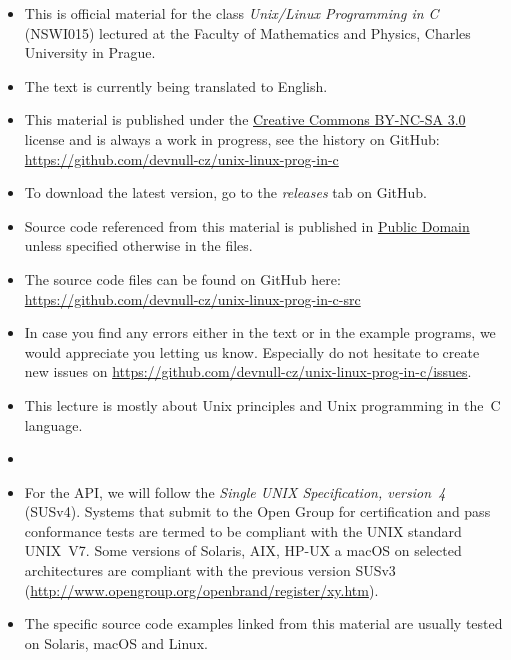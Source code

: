 \begin{itemize}
\item This is official material for the class \emph{Unix/Linux Programming in C}
(NSWI015) lectured at the Faculty of Mathematics and Physics, Charles University
in Prague.
\item The text is currently being translated to English.
\item This material is published under the
\href{http://creativecommons.org/licenses/by-nc-sa/3.0/cz/}{Creative Commons
BY-NC-SA 3.0} license and is always a work in progress, see the history on
GitHub:\\
\url{https://github.com/devnull-cz/unix-linux-prog-in-c}
\item To download the latest version, go to the \emph{releases} tab on GitHub.
\item Source code referenced from this material is published in
\href{http://creativecommons.org/licenses/publicdomain/}{Public Domain} unless
specified otherwise in the files.
\item The source code files can be found on GitHub here:\\
\url{https://github.com/devnull-cz/unix-linux-prog-in-c-src}
\item In case you find any errors either in the text or in the example programs,
we would appreciate you letting us know. Especially do not hesitate to create new
issues on \url{https://github.com/devnull-cz/unix-linux-prog-in-c/issues}.
\end{itemize}

\pagebreak

\begin{slide}
\end{slide}

\begin{itemize}
\item This lecture is mostly about Unix principles and Unix programming in the~C
language.
\item {}
\item For the API, we will follow the \emph{Single UNIX Specification,
version~4} (SUSv4). Systems that submit to the Open Group for certification and
pass conformance tests are termed to be compliant with the UNIX standard
UNIX~V7.  Some versions of Solaris, AIX, HP-UX a macOS on selected architectures
are compliant with the previous version SUSv3
(\url{http://www.opengroup.org/openbrand/register/xy.htm}).
\item The specific source code examples linked from this material are usually
tested on Solaris, macOS and Linux.
\end{itemize}

